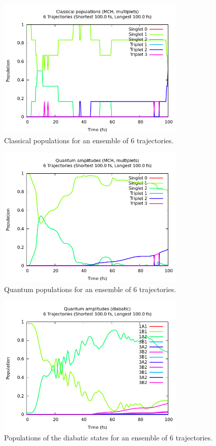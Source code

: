 \documentclass[a4paper,11pt,DIV=15,openany]{scrbook}
\begin{document}
\begin{figure}[ptb]
  \centering
  \includegraphics[width=0.8\textwidth]{figures/pop_class.png}
  \caption{Classical populations for an ensemble of 6 trajectories.}
  \label{fig:pop_class}
\end{figure}
\begin{figure}[ptb]
  \centering
  \includegraphics[width=0.8\textwidth]{figures/pop_quant.png}
  \caption{Quantum populations for an ensemble of 6 trajectories.}
  \label{fig:pop_quant}
\end{figure}
\begin{figure}[ptb]
  \centering
  \includegraphics[width=0.8\textwidth]{figures/pop_diab.png}
  \caption{Populations of the diabatic states for an ensemble of 6 trajectories.}
  \label{fig:pop_diab}
\end{figure}
\end{document}
